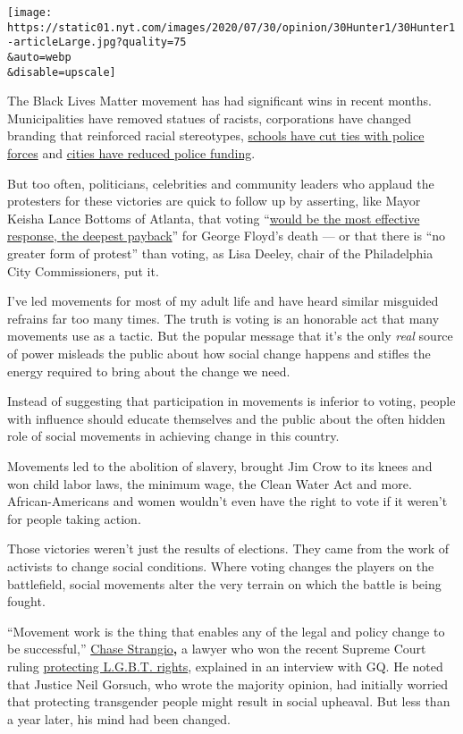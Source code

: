 \texttt{[image: https://static01.nyt.com/images/2020/07/30/opinion/30Hunter1/30Hunter1-articleLarge.jpg?quality=75\\\&auto=webp\\\&disable=upscale]}

The Black Lives Matter movement has had significant wins in recent
months. Municipalities have removed statues of racists, corporations
have changed branding that reinforced racial stereotypes,
\href{https://www.nytimes.com/2020/06/12/us/schools-police-resource-officers.html}{schools
have cut ties with police forces} and
\href{https://www.nytimes.com/2020/06/08/us/unrest-defund-police.html}{cities
have reduced police funding}.

But too often, politicians, celebrities and community leaders who
applaud the protesters for these victories are quick to follow up by
asserting, like Mayor Keisha Lance Bottoms of Atlanta, that voting
``\href{https://www.nytimes.com/2020/06/03/opinion/police-protests-atlanta-keisha-bottoms.html}{would
be the most effective response, the deepest payback}'' for George
Floyd's death --- or that there is ``no greater form of protest'' than
voting, as Lisa Deeley, chair of the Philadelphia City Commissioners,
put it.

I've led movements for most of my adult life and have heard similar
misguided refrains far too many times. The truth is voting is an
honorable act that many movements use as a tactic. But the popular
message that it's the only \emph{real} source of power misleads the
public about how social change happens and stifles the energy required
to bring about the change we need.

Instead of suggesting that participation in movements is inferior to
voting, people with influence should educate themselves and the public
about the often hidden role of social movements in achieving change in
this country.

Movements led to the abolition of slavery, brought Jim Crow to its knees
and won child labor laws, the minimum wage, the Clean Water Act and
more. African-Americans and women wouldn't even have the right to vote
if it weren't for people taking action.

Those victories weren't just the results of elections. They came from
the work of activists to change social conditions. Where voting changes
the players on the battlefield, social movements alter the very terrain
on which the battle is being fought.

``Movement work is the thing that enables any of the legal and policy
change to be successful,''
\href{https://www.gq.com/story/chase-strangio-aclu-lgbtq-legal-victory}{Chase
Strangio}\textbf{,} a lawyer who won the recent Supreme Court ruling
\href{https://www.nytimes.com/2020/06/15/us/gay-transgender-workers-supreme-court.html}{protecting
L.G.B.T. rights}, explained in an interview with GQ. He noted that
Justice Neil Gorsuch, who wrote the majority opinion, had initially
worried that protecting transgender people might result in social
upheaval. But less than a year later, his mind had been changed.

